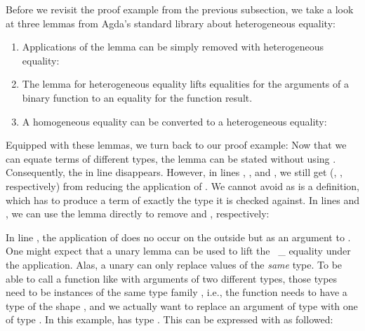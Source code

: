 \documentclass[acmsmall,anonymous,review,screen]{acmart}
\begin{document}
Before we revisit the proof example from the previous subsection, we take a look
at three lemmas from Agda's standard library about heterogeneous equality:

\begin{enumerate}
\item 
  Applications of the {\Asubst} lemma can be simply removed with heterogeneous equality:
  \SubstExamplesHetEqSubstRemovable
\item 
  The {} lemma for heterogeneous equality lifts
  equalities for the arguments of a binary function to an equality 
  for the function result.
  \SubstExamplesHetEqCongII
\item 
  A homogeneous equality can be converted to a heterogeneous equality:
  \SubstExamplesHetEqConv
\end{enumerate}

Equipped with these lemmas, we turn back to our proof example:
\SubstExamplesFusionESubESubHet
Now that we can equate terms of different types, the lemma can be
stated without using {\Asubst}.
Consequently, the {} in line  disappears.
However, in lines , , and , we still get
{} ({}, {}, respectively) from reducing the application of {\AESub}.
We cannot avoid {} as {\AESub} is a definition, which has to
produce a term of exactly the type it is checked against.
In lines  and , we can use the {} lemma
directly to remove {} and {}, respectively:
\SubstExamplesFusionESubESubHetProofB

In line , the application of {} does no occur on the outside but as an argument to
. One might expect that a unary {} lemma can be used to
lift the {~\_} equality under the application.
Alas, a unary {} can only replace values of the \emph{same} type.
To be able to call a function like {} with arguments of two different types,
those types need to be instances of the same type family ,
i.e., the function needs to have a type of the shape
, and we actually want to
replace an argument of type  with one of type .
In this example,  has type
.
This can be expressed with {} as followed:
\SubstExamplesFusionESubESubHetProofA
\end{document}
